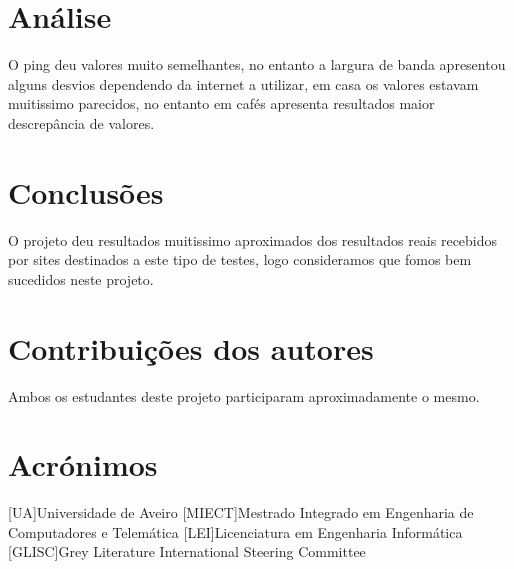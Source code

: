 \documentclass{report}
\begin{document}
\chapter{Análise}
\label{chap.analise}
O ping deu valores muito semelhantes, no entanto a largura de banda apresentou alguns desvios dependendo da internet a utilizar, em casa os valores estavam muitissimo parecidos, no entanto em cafés apresenta resultados maior descrepância de valores. 

\chapter{Conclusões}
\label{chap.conclusao}
O projeto deu resultados muitissimo aproximados dos resultados reais recebidos por sites destinados a este tipo de testes, logo consideramos que fomos bem sucedidos neste projeto.

\chapter*{Contribuições dos autores}
Ambos os estudantes deste projeto participaram aproximadamente o mesmo.

\chapter*{Acrónimos}
\begin{acronym}
[UA]{Universidade de Aveiro}
[MIECT]{Mestrado Integrado em Engenharia de Computadores e Telemática}
[LEI]{Licenciatura em Engenharia Informática}
[GLISC]{Grey Literature International Steering Committee}
\end{acronym}


\printbibliography
\end{document}
